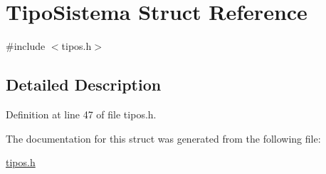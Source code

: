 \hypertarget{struct_tipo_sistema}{}\section{Tipo\+Sistema Struct Reference}
\label{struct_tipo_sistema}


{\ttfamily \#include $<$tipos.\+h$>$}



\subsection{Detailed Description}


Definition at line 47 of file tipos.\+h.



The documentation for this struct was generated from the following file\+:\begin{DoxyCompactItemize}
\item 
\mbox{\hyperlink{tipos_8h}{tipos.\+h}}\end{DoxyCompactItemize}
